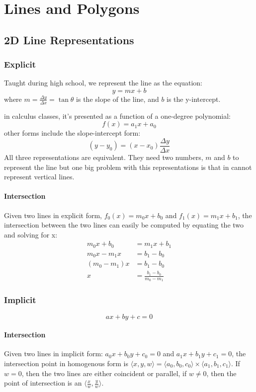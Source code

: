 \documentclass[12pt]{report}
\begin{document}
\chapter{Lines and Polygons}
\section{2D Line Representations}
	\subsection{Explicit}
	Taught during high school, we represent the line as the equation: $$
	y = mx + b
	$$
	where $m = \frac{\Delta y}{\Delta x} = \tan \theta$ is the slope of the line, and $b$ is the y-intercept.
	
	in calculus classes, it's presented as a function of a one-degree polynomial:
	$$
	f(x) = a_1x + a_0
	$$
	other forms include the slope-intercept form:
	$$
	(y - y_0) = (x - x_0)\frac{\Delta y}{\Delta x}
	$$
	All three representations are equivalent. They need two numbers, $m$ and $b$ to represent the line but one big problem with this representations is that in cannot represent vertical lines.
		\subsubsection{Intersection}
			Given two lines in explicit form, $f_0(x) = m_0x + b_0$ and $f_1(x) = m_1x + b_1$, the intersection between the two lines can easily be computed by equating the two and solving for x: 
			\begin{align*}
			m_0x + b_0 &= m_1x + b_1 \\
			m_0x - m_1x &= b_1 - b_0\\
			(m_0 - m_1)x &= b_1 - b_0\\
			x &= \frac{b_1 - b_0}{m_0 - m_1}
			\end{align*}
	\subsection{Implicit}
	$$
	ax + by + c = 0
	$$
		\subsubsection{Intersection}
		Given two lines in implicit form: $a_0x + b_0y + c_0 = 0$ and $a_1x + b_1y + c_1 = 0$, the intersection point in homogenous form is $\langle x, y, w \rangle = \langle a_0, b_0, c_0 \rangle \times \langle a_1, b_1, c_1 \rangle$.
		If $w = 0$, then the two lines are either coincident or parallel, if $w \neq 0$, then the point of intersection is an $\langle \frac{x}{w}, \frac{y}{w} \rangle$.
\end{document}
